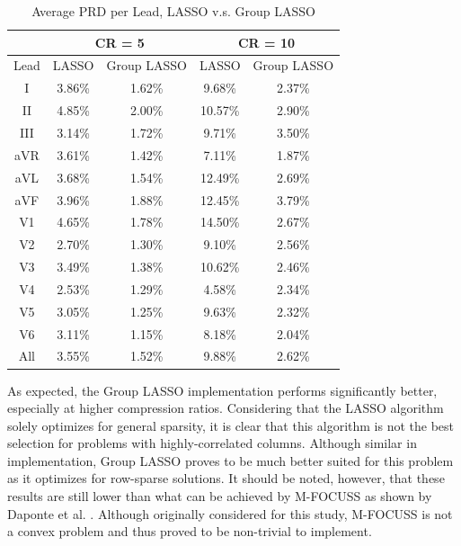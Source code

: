 \begin{table}[H]
    \centering
    \begin{tabular}{|c|c|c|c|c|}
        \hline
        \multicolumn{1}{|c|}{} & 
        \multicolumn{2}{c|}{\textbf{CR = 5}} & 
        \multicolumn{2}{c|}{\textbf{CR = 10}} \\
        \hline
        Lead & LASSO & Group LASSO & LASSO & Group LASSO \\
        \hline
        I & 3.86\% & 1.62\% & 9.68\% & 2.37\% \\
        II & 4.85\% & 2.00\% & 10.57\% & 2.90\% \\
        III & 3.14\% & 1.72\% & 9.71\% & 3.50\% \\
        aVR & 3.61\% & 1.42\% & 7.11\% & 1.87\% \\
        aVL & 3.68\% & 1.54\% & 12.49\% & 2.69\% \\
        aVF & 3.96\% & 1.88\% & 12.45\% & 3.79\% \\
        V1 & 4.65\% & 1.78\% & 14.50\% & 2.67\% \\
        V2 & 2.70\% & 1.30\% & 9.10\% & 2.56\% \\
        V3 & 3.49\% & 1.38\% & 10.62\% & 2.46\% \\
        V4 & 2.53\% & 1.29\% & 4.58\% & 2.34\% \\
        V5 & 3.05\% & 1.25\% & 9.63\% & 2.32\% \\
        V6 & 3.11\% & 1.15\% & 8.18\% & 2.04\% \\
        \hline
        All & 3.55\% & 1.52\% & 9.88\% & 2.62\% \\
        \hline
    \end{tabular}
    \caption{Average PRD per Lead, LASSO v.s. Group LASSO}
    \label{tab:compare_algs}
\end{table}

As expected, the Group LASSO implementation performs significantly better, especially at higher compression ratios.
Considering that the LASSO algorithm solely optimizes for general sparsity, it is clear that this algorithm is not the best selection for problems with highly-correlated columns.
Although similar in implementation, Group LASSO proves to be much better suited for this problem as it optimizes for row-sparse solutions.
It should be noted, however, that these results are still lower than what can be achieved by M-FOCUSS as shown by Daponte et al. \citep{daponte2021}.
Although originally considered for this study, M-FOCUSS is not a convex problem and thus proved to be non-trivial to implement.

